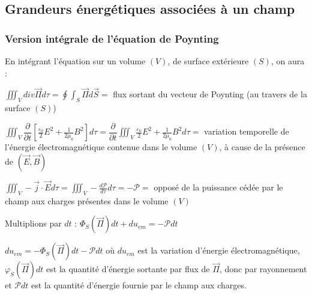 \documentclass[a4paper,12pt]{book}
\begin{document}
\subsection{Grandeurs énergétiques associées à un champ}
\subsubsection{Version intégrale de l'équation de Poynting}
En intégrant l'équation sur un volume $(V)$, de surface extérieure $(S)$, on aura :
\par $\iiint_V div\vec{\Pi}d\tau = \oint\int_S \vec{\Pi}d\vec{S} =$ flux sortant du vecteur de Poynting (au travers de la surface $(S)$)
\par $\iiint_V\dfrac{\partial}{\partial t}\left[\frac{\varepsilon_0}{2}E^2 + \frac{1}{2\mu_0}B^2\right]d\tau = \dfrac{\partial}{\partial t}\iiint_V\frac{\varepsilon_0}{2}E^2 + \frac{1}{2\mu_0}B^2d\tau = $ variation temporelle de l'énergie électromagnétique contenue dans le volume $(V)$, à cause de la présence de $(\vec{E},\vec{B})$
\par $\iiint_V -\vec{j}\cdot\vec{E}d\tau = \iiint_V-\frac{d\mathcal{P}}{d\tau}d\tau = -\mathcal{P} =$ opposé de la puissance cédée par le champ aux charges présentes dans le volume $(V)$
\par Multiplions par $dt$ : $\Phi_S(\vec{\Pi})dt + du_{em}=-\mathcal{P}dt$ \par $du_{em} = -\Phi_S(\vec{\Pi})dt-\mathcal{P}dt$ où $du_{em}$ est la variation d'énergie électromagnétique, $\varphi_S(\vec{\Pi})dt$ est la quantité d'énergie sortante par flux de $\vec{\Pi}$, donc par rayonnement et $\mathcal{P}dt$ est la quantité d'énergie fournie par le champ aux charges.
\end{document}
